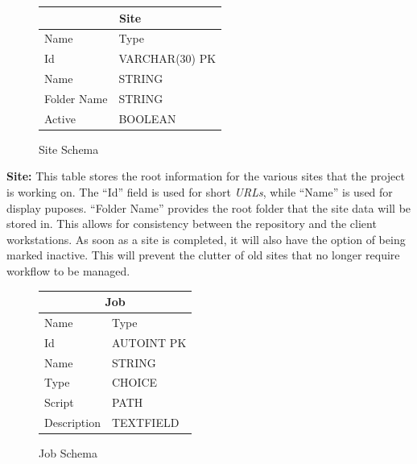 \begin{figure}
\begin{tabular}{l|l}
    \multicolumn{2}{c}{Site} \\
    \hline
    Name        & Type \\
    \hline
    Id          & VARCHAR(30) PK \\
    Name        & STRING \\
    Folder Name & STRING \\
    Active      & BOOLEAN \\
\end{tabular}
\caption{Site Schema}
\end{figure}
\noindent\textbf{Site:}
This table stores the root information for the various sites that
the project is working on. The ``Id'' field is used for short
\emph{URLs}, while ``Name'' is used for display puposes. ``Folder Name''
provides the root folder that the site data will be stored in. This
allows for consistency between the repository and the client workstations.
As soon as a site is completed, it will also have the option of being marked
inactive. This will prevent the clutter of old sites that no longer require
workflow to be managed.
\\
\begin{figure}
\begin{tabular}{l|l}
    \multicolumn{2}{c}{Job} \\
    \hline
    Name        & Type \\
    \hline
    Id          & AUTOINT PK \\
    Name        & STRING \\
    Type        & CHOICE \\
    Script      & PATH \\
    Description & TEXTFIELD \\
\end{tabular}
\caption{Job Schema}
\end{figure}

